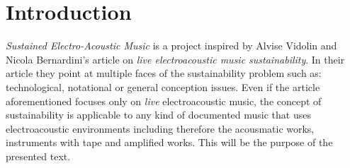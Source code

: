 \documentclass[twoside,a4paper]{article}
\title{\papertitle}
\begin{document}
\maketitle


\begin{abstract}

The musical composition is close to a point break: almost one hundred years ago Ottorino Respighi introduced a recorded media into his orchestral composition \emph{I Pini di Roma} and even today we don't have a shared consolidate electroacoustic practice to play it likewise the orchestral one. Someone does it better than others, by its own equilibrium between knowledge and consciousness. After all, it is only a recorded bird sound to be placed inside an orchestra, not a virtuoso part to be played on a handmade custom electroacoustic instrument disappeared from the earth except by memories and score notes. The problem is more serious and deep if consider most of today's electroacoustic-manipulators don't know who Respighi was and what happened after him. Something must change to introduce a way that conducts a practice consolidation on literature.

\end{abstract}


\section{Introduction}
\label{sec:intro}

\emph{Sustained Electro-Acoustic Music} is a project inspired by Alvise Vidolin and Nicola Bernardini's article on \emph{live electroacoustic music sustainability}. In their article they point at multiple faces of the sustainability problem such as: technological, notational or general conception issues. Even if the article aforementioned focuses only on \emph{live} electroacoustic music, the concept of sustainability is applicable to any kind of documented music that uses electroacoustic environments including therefore the acousmatic works, instruments with tape and amplified works. This will be the purpose of the presented text.
\end{document}
